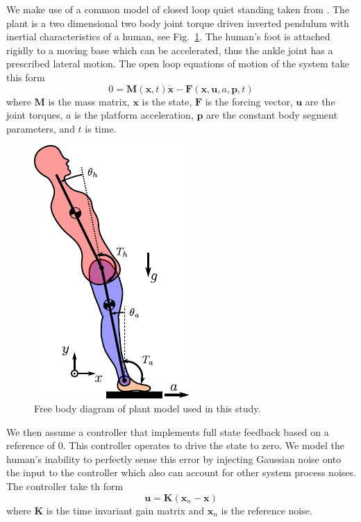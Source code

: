 \documentclass[11pt,a4paper,twocolumn]{article}
\begin{document}
We make use of a common model of closed loop quiet standing taken from
\cite{Park2004}. The plant is a two dimensional two body joint torque driven
inverted pendulum with inertial characteristics of a human, see
Fig.~\ref{fig:free-body-diagram}. The human's foot is attached rigidly to a
moving base which can be accelerated, thus the ankle joint has a prescribed
lateral motion. The open loop equations of motion of the system take this form
%
\begin{equation}
  0 = \mathbf{M}(\mathbf{x}, t) \dot{\mathbf{x}} - \mathbf{F}(\mathbf{x},
    \mathbf{u}, a, \mathbf{p}, t)
\end{equation}
%
where $\mathbf{M}$ is the mass matrix, $\mathbf{x}$ is the state, $\mathbf{F}$
is the forcing vector, $\mathbf{u}$ are the joint torques, $a$ is the platform
acceleration, $\mathbf{p}$ are the constant body segment parameters, and $t$ is
time.
%
\begin{figure}
  \centering
  \includegraphics{figures/free-body-diagram.pdf}
  \caption{Free body diagram of plant model used in this study.}
  \label{fig:free-body-diagram}
\end{figure}

We then assume a controller that implements full state feedback based on a
reference of 0. This controller operates to drive the state to zero. We model
the human's inability to perfectly sense this error by injecting Gaussian noise
onto the input to the controller which also can account for other system process
noises. The controller take th form
%
\begin{equation}
  \mathbf{u} = \mathbf{K} (\mathbf{x}_n - \mathbf{x})
\end{equation}
%
where $\mathbf{K}$ is the time invariant gain matrix and $\mathbf{x}_n$ is the
reference noise.
\end{document}
